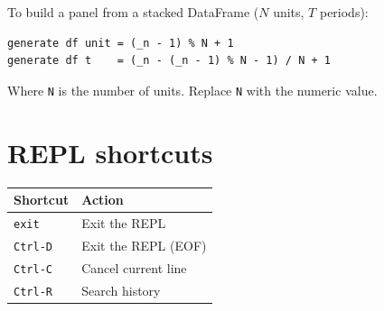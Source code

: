 To build a panel from a stacked DataFrame ($N$ units, $T$ periods):

\begin{lstlisting}[style=inline]
generate df unit = (_n - 1) % N + 1
generate df t    = (_n - (_n - 1) % N - 1) / N + 1
\end{lstlisting}

Where \texttt{N} is the number of units. Replace \texttt{N} with the numeric value.

\section{REPL shortcuts}

\begin{center}
\begin{tabular}{ll}
\toprule
\textbf{Shortcut} & \textbf{Action} \\
\midrule
\texttt{exit}    & Exit the REPL \\
\texttt{Ctrl-D}  & Exit the REPL (EOF) \\
\texttt{Ctrl-C}  & Cancel current line \\
\texttt{Ctrl-R}  & Search history \\
\bottomrule
\end{tabular}
\end{center}

